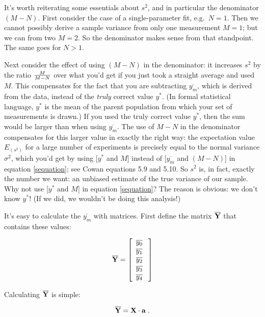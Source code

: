 \documentclass[psfig,preprint]{aastex}
\begin{document}
        It's worth reiterating some essentials about $s^2$, and in
particular the denominator $(M-N)$.  First consider the case of a
single-parameter fit, e.g.\ $N=1$.  Then we cannot possibly derive a
sample variance from only one measurement $M=1$; but we can from two
$M=2$.  So the denominator makes sense from that standpoint.  The same
goes for $N>1$. 

        Next consider the effect of using $(M-N)$ in the denominator: it
increases $s^2$ by the ratio ${M \over M-N}$ over what you'd get if you
just took a straight average and used $M$. This compensates for the fact
that you are subtracting $\overline {y_m}$, which is derived from
the data, instead of the {\it truly} correct value $y^*$. (In
formal statistical language, $y^*$ is the mean of the parent
population from which your set of measurements is drawn.) If you used
the truly correct value $y^*$, then the sum would be larger than
when using $\overline{ y_m}$. The use of $M-N$ in the denominator
compensates for this larger value in exactly the right way: the
expectation value $E_{(s^2)}$ for a large number of experiments is
precisely equal to the normal variance $\sigma^2$, which you'd get by
using [$y^*$ and $M$] instead of [$\overline{y_m}$ and
$(M-N)$] in equation \ref{sequation}; see Cowan equations 5.9 and 5.10.
So $s^2$ is, in fact, exactly the number  we want: an unbiased estimate
of the true variance of our sample. Why    not use [$y^*$ and $M$]
in equation \ref{sequation}? The reason is obvious: we don't know
$y^*$! (If we did, we wouldn't be doing this analysis!)

	It's easy to calculate the $\overline{y_m}$ with matrices.
First define the matrix ${\bf \overline{ Y}}$ that contains these
values:

\begin{eqnarray}
{\bf \overline{ Y}} = \left[
\begin{array}{c} 
\overline{y_0} \\ 
\overline{y_1} \\ 
\overline{y_2} \\ 
\overline{y_3} \\ 
\overline{y_4} \\ 
\end{array} 
\; \right]
\end{eqnarray} 

{\noindent} Calculating ${\bf \overline{ Y}}$ is simple:

\begin{equation} \label{ybardefinition}
{\bf \overline{ Y}} = {\bf  X \cdot a} \; . 
\end{equation}
\end{document}
